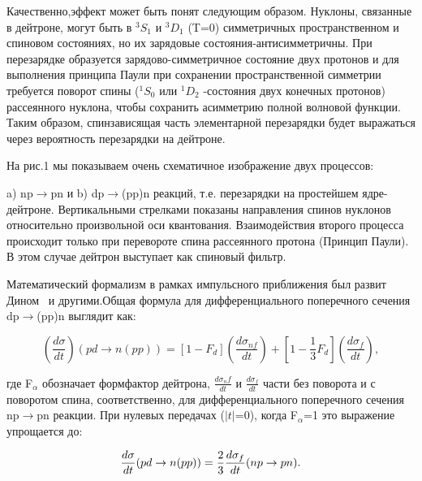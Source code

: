 \documentclass[a4paper,12pt]{article}
\begin{document}
{  \vspace {7mm}

  {\large\sf
    Качественно,эффект может быть понят следующим образом.
    Нуклоны, связанные в дейтроне, могут быть в $^3S_1$ и $^3D_1$
    (T=0) симметричных пространственном и спиновом состояниях,
    но их зарядовые состояния-анти\-симметричны. При перезарядке
    образуется зарядово-симметричное состояние двух протонов и для
    выполнения принципа Паули при сохране\-нии
    пространственной симметрии требуется поворот спины
    ($^1S_0$ или $^1D_2$ -состояния двух конечных протонов)
    рассеянного нуклона, чтобы сохранить
    асимметрию полной волновой функции. Таким образом, спин\-зависящая
    часть элементарной перезарядки будет выражаться
    через ве\-роятность перезарядки на дейтроне.

    На рис.1 мы показываем очень схематичное изображение
    двух процессов:

    a) np$\to$pn и b) dp$\to$(pp)n реакций, т.е. перезарядки на прос\-тейшем
    ядре-дейтроне. Вертикальными стрелками показаны направления спинов
    нуклонов отно\-сительно произвольной оси квантования. Взаи\-модействия
    второго про\-цесса происходит только при перевороте спина
    рассеянного протона (Принцип Паули). В этом случае дейтрон
    выступает как спиновый фильтр.

    Математический формализм в рамках импульсного
    приближения был развит Дином~\cite{Dea} и другими.Общая формула для
    дифференциального поперечного сечения dp$\to$(pp)n
    выглядит как:

    \vspace {7mm}

    \begin{equation}
      \left( \frac{d\sigma }{dt}\right) (pd\rightarrow n(pp))=[1-F_d]\left(
      \frac{d\sigma _{nf}}{dt}\right) +[1-\frac{1}{3}F_d]
      \left(\frac{d\sigma _f}{dt}\right),
    \end{equation}

    \vspace {7mm}

    где F$_\alpha$  обозначает формфактор дейтрона,
    $\frac{d\sigma_nf}{dt}$ и $\frac{d\sigma_f}{dt}$
    части без поворота и с поворотом спина, соответственно,
    для дифференциального попереч\-ного сечения np$\to$pn
    реакции. При нулевых передачах ($\vert t \vert$=0),
    когда F$_\alpha$=1 это выражение упрощается до:

    \vspace {7mm}
    \begin{equation}
      \frac{d\sigma }{dt}(pd\rightarrow n(pp))=\frac 23\frac{d\sigma _f}{%
        dt}(np\rightarrow pn).
    \end{equation}

}}
\end{document}
